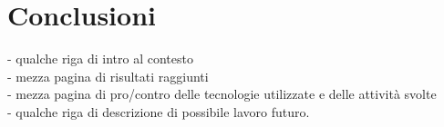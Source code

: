 \chapter*{Conclusioni}
\label{Conclusioni}
- qualche riga di intro al contesto
\\- mezza pagina di risultati raggiunti
\\- mezza pagina di pro/contro delle tecnologie utilizzate e delle attività svolte
\\- qualche riga di descrizione di possibile lavoro futuro.